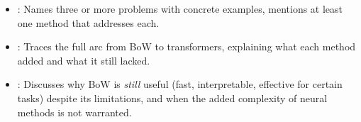 \begin{interviewq}
\goodgreat
\begin{itemize}
    \item {}: Names three or more problems with concrete examples, mentions at
    least one method that addresses each.
    \item {}: Traces the full arc from BoW to transformers, explaining what
    each method added and what it still lacked.
    \item {}: Discusses why BoW is \emph{still} useful (fast, interpretable,
    effective for certain tasks) despite its limitations, and when the added complexity of
    neural methods is not warranted.
\end{itemize}

\end{interviewq}

\vspace{0.5em}

